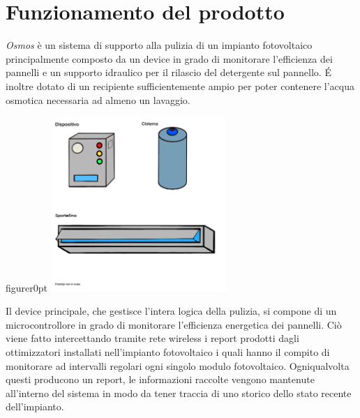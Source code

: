 \documentclass[a4paper, 12pt]{article}
\begin{document}
	\section{Funzionamento del prodotto}
	\emph{Osmos} è un sistema di supporto alla pulizia di un impianto fotovoltaico principalmente composto da un device in grado di monitorare l'efficienza dei pannelli 
	e un supporto idraulico per il rilascio del detergente sul pannello. \'E inoltre dotato di un recipiente sufficientemente ampio per poter contenere l'acqua osmotica necessaria ad almeno un lavaggio.\\
	\begin{wrapfloat}{figure}{r}{0pt}
		\includegraphics[width=0.5\textwidth]{Images/PROTOTIPO2.PNG}
	\end{wrapfloat}
	Il device principale, che gestisce l'intera logica della pulizia, si compone di un microcontrollore in grado di monitorare l'efficienza energetica dei pannelli. Ciò viene fatto intercettando tramite rete wireless i report prodotti dagli ottimizzatori installati nell'impianto fotovoltaico i quali hanno il compito di monitorare ad intervalli regolari ogni singolo modulo fotovoltaico. Ogniqualvolta questi producono un report, le informazioni raccolte vengono mantenute all'interno del sistema in modo da tener traccia di uno storico dello stato recente dell'impianto.\\
\end{document}
